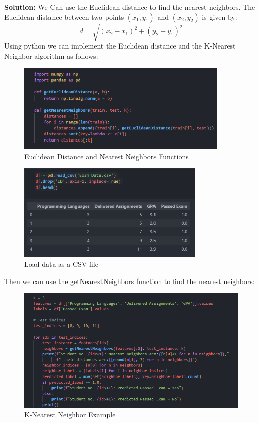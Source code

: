 \documentclass[a4paper,12pt]{article}
\begin{document}
\textbf{Solution:}
We Can use the Euclidean distance to find the nearest neighbors. The Euclidean distance between two points \( (x_1, y_1) \) and \( (x_2, y_2) \) is given by:
\[
d = \sqrt{(x_2 - x_1)^2 + (y_2 - y_1)^2}
\]
Using python we can implement the Euclidean distance and the K-Nearest Neighbor algorithm as follows:
\begin{figure}[H]
    \centering
    \includegraphics[width=0.9\textwidth]{knn.png}
    \caption{Euclidean Distance and Nearest Neighbors Functions}
    \label{fig:knn_code_example}
\end{figure}
\begin{figure}[H]
    \centering
    \includegraphics[width=0.8\textwidth]{data.png}
    \caption{Load data as a CSV file}
    \label{fig:dataframe_example}
\end{figure}
Then we can use the getNearestNeighbors function to find the nearest neighbors:
\begin{figure}[H]
    \centering
    \includegraphics[width=1\textwidth]{getNeighbours.png}
    \caption{K-Nearest Neighbor Example}
    \label{fig:knn_example}
\end{figure}
\end{document}
